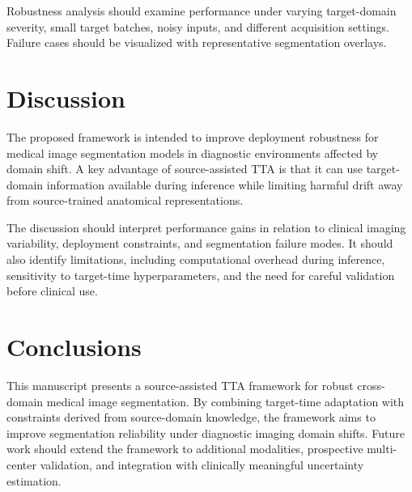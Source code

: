 \documentclass[diagnostics,article,submit,pdftex,moreauthors]{Definitions/mdpi}
\begin{document}
Robustness analysis should examine performance under varying target-domain severity, small target batches, noisy inputs, and different acquisition settings. Failure cases should be visualized with representative segmentation overlays.

\section{Discussion}

The proposed framework is intended to improve deployment robustness for medical image segmentation models in diagnostic environments affected by domain shift. A key advantage of source-assisted TTA is that it can use target-domain information available during inference while limiting harmful drift away from source-trained anatomical representations.

The discussion should interpret performance gains in relation to clinical imaging variability, deployment constraints, and segmentation failure modes. It should also identify limitations, including computational overhead during inference, sensitivity to target-time hyperparameters, and the need for careful validation before clinical use.

\section{Conclusions}

This manuscript presents a source-assisted TTA framework for robust cross-domain medical image segmentation. By combining target-time adaptation with constraints derived from source-domain knowledge, the framework aims to improve segmentation reliability under diagnostic imaging domain shifts. Future work should extend the framework to additional modalities, prospective multi-center validation, and integration with clinically meaningful uncertainty estimation.

\vspace{6pt}

\end{document}
